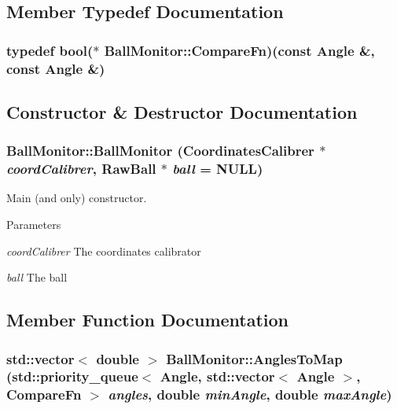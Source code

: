\subsection{Member Typedef Documentation}
\hypertarget{classBallMonitor_a5ad781c99d5b43bee7c838de9da75527}{
\subsubsection[{CompareFn}]{\setlength{\rightskip}{0pt plus 5cm}typedef bool($\ast$ {\bf BallMonitor::CompareFn})(const {\bf Angle} \&, const {\bf Angle} \&)}}
\label{classBallMonitor_a5ad781c99d5b43bee7c838de9da75527}


\subsection{Constructor \& Destructor Documentation}
\hypertarget{classBallMonitor_a176a257973eefa572b6972aa6b5a605d}{
\subsubsection[{BallMonitor}]{\setlength{\rightskip}{0pt plus 5cm}BallMonitor::BallMonitor ({\bf CoordinatesCalibrer} $\ast$ {\em coordCalibrer}, \/  RawBall $\ast$ {\em ball} = {\ttfamily NULL})}}
\label{classBallMonitor_a176a257973eefa572b6972aa6b5a605d}


Main (and only) constructor. 


\begin{DoxyParams}{Parameters}
\item[{\em coordCalibrer}]The coordinates calibrator \item[{\em ball}]The ball \end{DoxyParams}


\subsection{Member Function Documentation}
\hypertarget{classBallMonitor_acb5d7a14b07253e7db6b629878b25077}{
\subsubsection[{AnglesToMap}]{\setlength{\rightskip}{0pt plus 5cm}std::vector$<$ double $>$ BallMonitor::AnglesToMap (std::priority\_\-queue$<$ {\bf Angle}, std::vector$<$ {\bf Angle} $>$, {\bf CompareFn} $>$ {\em angles}, \/  double {\em minAngle}, \/  double {\em maxAngle})}}
\label{classBallMonitor_acb5d7a14b07253e7db6b629878b25077}


